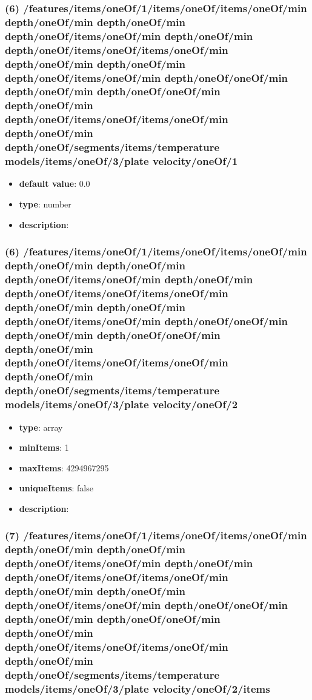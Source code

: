 \subsubsection{(6) /features/items/oneOf/1/items/oneOf/items/oneOf/min depth/oneOf/min depth/oneOf/min depth/oneOf/items/oneOf/min depth/oneOf/min depth/oneOf/items/oneOf/items/oneOf/min depth/oneOf/min depth/oneOf/min depth/oneOf/items/oneOf/min depth/oneOf/oneOf/min depth/oneOf/min depth/oneOf/oneOf/min depth/oneOf/min depth/oneOf/items/oneOf/items/oneOf/min depth/oneOf/min depth/oneOf/segments/items/temperature models/items/oneOf/3/plate velocity/oneOf/1}
\begin{itemize}[leftmargin=6em]\item {\bf default value}: 0.0
\item {\bf type}: number
\item {\bf description}: 
\end{itemize}\subsubsection{(6) /features/items/oneOf/1/items/oneOf/items/oneOf/min depth/oneOf/min depth/oneOf/min depth/oneOf/items/oneOf/min depth/oneOf/min depth/oneOf/items/oneOf/items/oneOf/min depth/oneOf/min depth/oneOf/min depth/oneOf/items/oneOf/min depth/oneOf/oneOf/min depth/oneOf/min depth/oneOf/oneOf/min depth/oneOf/min depth/oneOf/items/oneOf/items/oneOf/min depth/oneOf/min depth/oneOf/segments/items/temperature models/items/oneOf/3/plate velocity/oneOf/2}
\begin{itemize}[leftmargin=6em]\item {\bf type}: array
\item {\bf minItems}: 1
\item {\bf maxItems}: 4294967295
\item {\bf uniqueItems}: false
\item {\bf description}: 
\end{itemize}\subsubsection{(7) /features/items/oneOf/1/items/oneOf/items/oneOf/min depth/oneOf/min depth/oneOf/min depth/oneOf/items/oneOf/min depth/oneOf/min depth/oneOf/items/oneOf/items/oneOf/min depth/oneOf/min depth/oneOf/min depth/oneOf/items/oneOf/min depth/oneOf/oneOf/min depth/oneOf/min depth/oneOf/oneOf/min depth/oneOf/min depth/oneOf/items/oneOf/items/oneOf/min depth/oneOf/min depth/oneOf/segments/items/temperature models/items/oneOf/3/plate velocity/oneOf/2/items}
